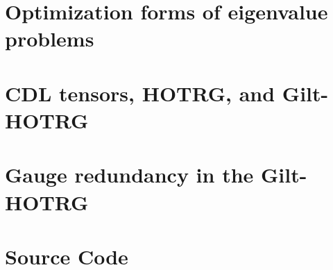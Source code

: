 \documentclass[aps,prb,reprint,superscriptaddress]{revtex4-2}
\begin{document}
\appendix
\section{Optimization forms of eigenvalue problems\label{appd:opteig}}

\section{CDL tensors, HOTRG, and Gilt-HOTRG\label{appd:cdlHOTRG}}

\section{Gauge redundancy in the Gilt-HOTRG\label{appd:gaugeFix}}

\section{Source Code}


\end{document}
